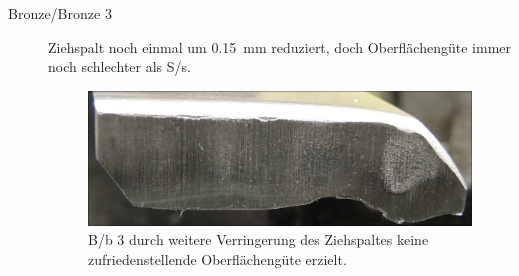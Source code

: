 \documentclass[12pt,a4paper,parskip,twoside,BCOR5mm,headsepline]{scrartcl}
\begin{document}
\begin{description*}
\begin{description}
\item[Bronze/Bronze 3] Ziehspalt noch einmal um \SI{0.15}{\milli\meter}  reduziert, doch Oberflächengüte immer noch schlechter als S/s.
\begin{figure}[H]
\centering
\includegraphics[width=.8\textwidth]{Bb3a}
\caption{B/b 3 durch weitere Verringerung des Ziehspaltes keine zufriedenstellende Oberflächengüte erzielt. }
\label{fig:Bb3a}
\end{figure}




\end{description}
\end{description*}
\end{document}
